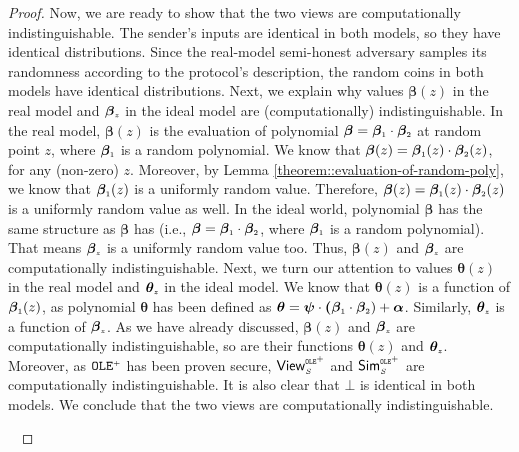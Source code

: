 \begin{proof}
Now, we are ready to show that the two views are computationally indistinguishable. The sender's inputs are identical in both models, so they have identical distributions. Since the real-model semi-honest adversary samples its randomness according to the protocol's description, the random coins in both models have identical distributions.  Next, we explain why values $\bm\beta(z)$ in the real model and $\bm\beta_{\scriptscriptstyle z}$ in the ideal model are (computationally) indistinguishable. In the real model, $\bm\beta(z)$ is the evaluation of polynomial $\bm\beta=\bm\beta_{\scriptscriptstyle 1}\cdot \bm\beta_{\scriptscriptstyle 2}$ at random point $z$, where $\bm\beta_{\scriptscriptstyle 1}$ is a random polynomial. We know that $\bm\beta(z)=\bm\beta_{\scriptscriptstyle 1}(z)\cdot \bm\beta_{\scriptscriptstyle 2}(z)$, for any (non-zero) $z$.  Moreover, by Lemma \ref{theorem::evaluation-of-random-poly}, we know that $\bm\beta_{\scriptscriptstyle 1}(z)$ is a uniformly random value. Therefore, $\bm\beta(z)=\bm\beta_{\scriptscriptstyle 1}(z)\cdot \bm\beta_{\scriptscriptstyle 2}(z)$ is a uniformly random value as well. In the ideal world, polynomial $\bm\beta$ has the same structure as $\bm\beta$ has (i.e., $\bm\beta=\bm\beta_{\scriptscriptstyle 1}\cdot \bm\beta_{\scriptscriptstyle 2}$, where $\bm\beta_{\scriptscriptstyle 1}$ is a random polynomial). That means $\bm\beta_{\scriptscriptstyle z}$ is a uniformly random value too. Thus,  $\bm\beta(z)$ and $\bm\beta_{\scriptscriptstyle z}$ are computationally indistinguishable. Next, we turn our attention to values $\bm\theta(z)$ in the real model and $\bm\theta_{\scriptscriptstyle z}$ in the ideal model. We know that $\bm\theta(z)$ is a function of $\bm\beta_{\scriptscriptstyle 1}(z)$, as polynomial $\bm\theta$ has been defined as $\bm\theta=\bm\psi\cdot \bm(\bm\beta_{\scriptscriptstyle 1}\cdot \bm\beta_{\scriptscriptstyle 2})+\bm\alpha$. Similarly, $\bm\theta_{\scriptscriptstyle z}$ is a function of  $\bm\beta_{\scriptscriptstyle z}$. As we have already discussed,  $\bm\beta(z)$ and $\bm\beta_{\scriptscriptstyle z}$ are computationally indistinguishable, so are their functions $\bm\theta(z)$ and $\bm\theta_{\scriptscriptstyle z}$. Moreover, as  $\mathtt{OLE}^{\scriptscriptstyle +}$ has been proven secure,  $\mathsf{View}^{\scriptscriptstyle \mathtt{OLE}^{\scriptscriptstyle +}}_{\scriptscriptstyle S}$ and  $\mathsf{Sim}^{\scriptscriptstyle \mathtt{OLE}^{\scriptscriptstyle +}}_{\scriptscriptstyle S}$ are computationally indistinguishable. It is also clear that $\bot$ is identical in both models. We conclude that the two views are computationally indistinguishable.


\



\end{proof}
